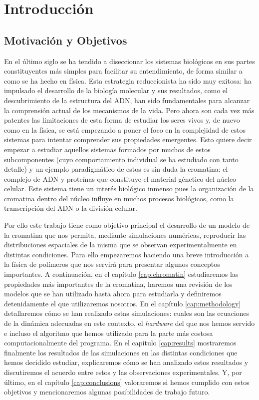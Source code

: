 \chapter{Introducción}
\label{cap:introduction}

\section{Motivación y Objetivos}

En el último siglo se ha tendido a diseccionar los sistemas biológicos en sus partes constituyentes más simples para facilitar su entendimiento, de forma similar a como se ha hecho en física. Esta estrategia reduccionista ha sido muy exitosa: ha impulsado el desarrollo de la biología molecular y sus resultados, como el descubrimiento de la estructura del ADN, han sido fundamentales para alcanzar la comprensión actual de los mecanismos de la vida. Pero ahora son cada vez más patentes las limitaciones de esta forma de estudiar los seres vivos y, de nuevo como en la física, se está empezando a poner el foco en la complejidad de estos sistemas para intentar comprender sus propiedades emergentes. Esto quiere decir empezar a estudiar aquellos sistemas formados por muchos de estos subcomponentes (cuyo comportamiento individual se ha estudiado con tanto detalle) y un ejemplo paradigmático de estos es sin duda la cromatina: el complejo de ADN y proteínas que constituye el material génetico del núcleo celular. Este sistema tiene un interés biológico inmenso pues la organización de la cromatina dentro del núcleo influye en muchos procesos biológicos, como la transcripción del ADN o la división celular.

Por ello este trabajo tiene como objetivo principal el desarrollo de un modelo de la cromatina que nos permita, mediante simulaciones numéricas, reproducir las distribuciones espaciales de la misma que se observan experimentalmente en distintas condiciones. Para ello empezaremos haciendo una breve introducción a la física de polímeros que nos servirá para presentar algunos conceptos importantes. A continuación, en el capítulo \ref{cap:chromatin} estudiaremos las propiedades más importantes de la cromatina, haremos una revisión de los modelos que se han utilizado hasta ahora para estudiarla y definiremos detenidamente el que utilizaremos nosotros. En el capítulo \ref{cap:methodology} detallaremos cómo se han realizado estas simulaciones: cuales son las ecuaciones de la dinámica adecuadas en este contexto, el \textit{hardware} del que nos hemos servido e incluso el algoritmo que hemos utilizado para la parte más costosa computacionalmente del programa. En el capítulo \ref{cap:results} mostraremos finalmente los resultados de las simulaciones en las distintas condiciones que hemos decidido estudiar, explicaremos cómo se han analizado estos resultados y discutiremos el acuerdo entre estos y las observaciones experimentales. Y, por último, en el capítulo \ref{cap:conclusions} valoraremos si hemos cumplido con estos objetivos y mencionaremos algunas posibilidades de trabajo futuro.

